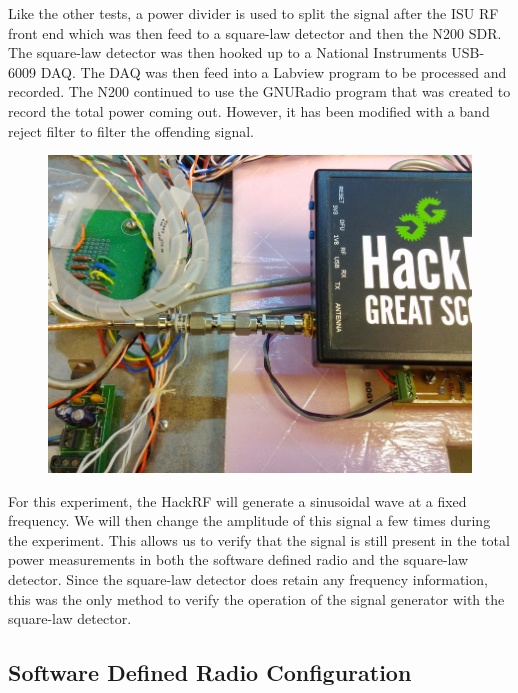 Like the other tests, a power divider is used to split the signal after the ISU RF front end which was then feed to a square-law detector and then the N200 SDR.  The square-law detector was then hooked up to a National Instruments USB-6009 DAQ.  The DAQ was then feed into a Labview program to be processed and recorded.  The N200 continued to use the GNURadio program that was created to record the total power coming out.  However, it has been modified with a band reject filter to filter the offending signal.

\begin{figure}[h!tb] \centering

\includegraphics[width=\textwidth]{Images/Hack_RF.jpg}
\label{HackRF}
\end{figure} 

For this experiment, the HackRF will generate a sinusoidal wave at a fixed frequency.  We will then change the amplitude of this signal a few times during the experiment.  This allows us to verify that the signal is still present in the total power measurements in both the software defined radio and the square-law detector.  Since the square-law detector does retain any frequency information, this was the only method to verify the operation of the signal generator with the square-law detector.   

\subsection{Software Defined Radio Configuration}

